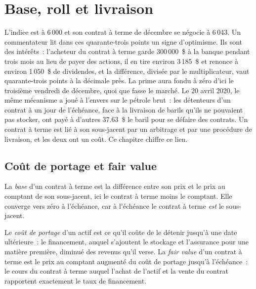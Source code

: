 \chapter{Base, roll et livraison}\label{ch:m1:basis-roll-and-delivery}

L'indice est à 6\,000 et son contrat à terme de décembre se négocie à 6\,043. Un
commentateur lit dans ces quarante-trois points un signe d'optimisme. Ils
sont des intérêts~: l'acheteur du contrat à terme garde 300\,000~\$ à la banque pendant trois mois au lieu de
payer des actions, il en tire environ 3\,185~\$ et renonce à environ 1\,050~\$ de
dividendes, et la différence, divisée par le multiplicateur, vaut quarante-trois
points à la décimale près. La prime aura fondu à zéro d'ici le troisième vendredi de
décembre, quoi que fasse le marché. Le 20 avril 2020, le même mécanisme a joué
à l'envers sur le pétrole brut~: les détenteurs d'un contrat à un jour de l'échéance, face
à la livraison de barils qu'ils ne pouvaient pas stocker, ont payé à d'autres 37.63~\$ le baril pour se défaire des
contrats. Un contrat à terme est lié à son sous-jacent par un arbitrage et par
une procédure de livraison, et les deux ont un coût. Ce chapitre chiffre ce lien.

\section{Coût de portage et fair value}

\begin{definition}[Base]\label{def:m1:basis-roll-and-delivery:basis}
La \emph{base} d'un contrat à terme est la différence entre son prix
et le prix au comptant de son sous-jacent, ici le contrat à terme moins le comptant. Elle converge vers
zéro à l'échéance, car à l'échéance le contrat à terme \emph{est} le sous-jacent.
\end{definition}

\begin{definition}\label{def:m1:basis-roll-and-delivery:carry}
Le \emph{coût de portage} d'un actif est ce qu'il coûte de
le détenir jusqu'à une date ultérieure~: le financement, auquel s'ajoutent le stockage et l'assurance pour une
matière première, diminué des revenus qu'il verse. La \emph{fair value}
d'un contrat à terme est le prix au comptant augmenté du coût de portage jusqu'à l'échéance~: le cours du
contrat à terme auquel l'achat de l'actif et la vente du contrat rapportent exactement le
taux de financement.
\end{definition}

